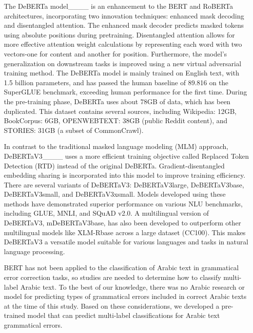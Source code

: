 The DeBERTa model____ is an enhancement to the BERT and RoBERTa architectures, incorporating two innovation techniques: enhanced mask decoding and disentangled attention.  The enhanced mask decoder predicts masked tokens using absolute positions during pretraining. Disentangled attention allows for more effective attention weight calculations by representing each word with two vectors-one for content and another for position. Furthermore, the model's generalization on downstream tasks is improved using a new virtual adversarial training method. The DeBERTa model is mainly trained on English text, with 1.5 billion parameters, and has passed the human baseline of 89.816 on the SuperGLUE benchmark, exceeding human performance for the first time.  During the pre-training phase, DeBERTa uses about 78GB of data, which has been duplicated. This dataset contains several sources, including Wikipedia: 12GB, BookCorpus: 6GB, OPENWEBTEXT: 38GB (public Reddit content), and STORIES: 31GB (a subset of CommonCrawl).


In contrast to the traditional masked language modeling (MLM) approach, DeBERTaV3____ uses a more efficient training objective called Replaced Token Detection (RTD) instead of the original DeBERTa. Gradient-disentangled embedding sharing is incorporated into this model to improve training efficiency. There are several variants of DeBERTaV3: DeBERTaV3large, DeBERTaV3base, DeBERTaV3small, and DeBERTaV3xsmall. Models developed using these methods have demonstrated superior performance on various NLU benchmarks, including GLUE, MNLI, and SQuAD v2.0. A multilingual version of DeBERTaV3, mDeBERTaV3base, has also been developed to outperform other multilingual models like XLM-Rbase across a large dataset (CC100). This makes DeBERTaV3 a versatile model suitable for various languages and tasks in natural language processing.

BERT has not been applied to the classification of Arabic text in grammatical error correction tasks, so studies are needed to determine how to classify multi-label Arabic text. To the best of our knowledge, there was no Arabic research or model for predicting types of grammatical errors included in correct Arabic texts at the time of this study. Based on these considerations, we developed a pre-trained model that can predict multi-label classifications for Arabic text grammatical errors.


